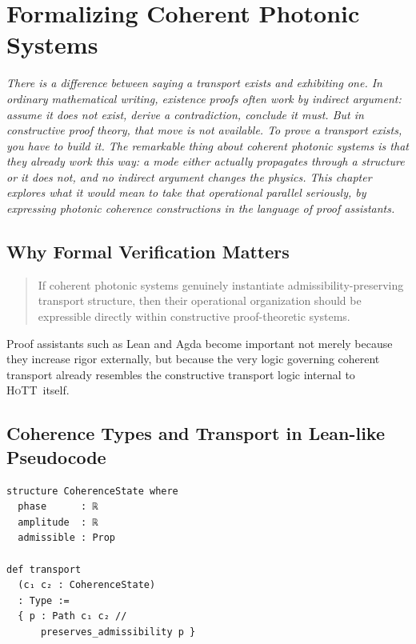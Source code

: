 \documentclass[11pt,openany]{book}
\theoremstyle{definition}
\theoremstyle{plain}
\newcommand{\HoTT}{\textsc{HoTT}}
\begin{document}

\chapter{Formalizing Coherent Photonic Systems}

\noindent\textit{There is a difference between saying a transport exists and exhibiting one. In ordinary mathematical writing, existence proofs often work by indirect argument: assume it does not exist, derive a contradiction, conclude it must. But in constructive proof theory, that move is not available. To prove a transport exists, you have to build it. The remarkable thing about coherent photonic systems is that they already work this way: a mode either actually propagates through a structure or it does not, and no indirect argument changes the physics. This chapter explores what it would mean to take that operational parallel seriously, by expressing photonic coherence constructions in the language of proof assistants.}

\bigskip

\section{Why Formal Verification Matters}

\begin{quote}
If coherent photonic systems genuinely instantiate admissibility-preserving transport structure, then their operational organization should be expressible directly within constructive proof-theoretic systems.
\end{quote}

Proof assistants such as Lean and Agda become important not merely because they increase rigor externally, but because the very logic governing coherent transport already resembles the constructive transport logic internal to \HoTT\ itself.

\section{Coherence Types and Transport in Lean-like Pseudocode}

\begin{verbatim}
structure CoherenceState where
  phase      : ℝ
  amplitude  : ℝ
  admissible : Prop

def transport
  (c₁ c₂ : CoherenceState)
  : Type :=
  { p : Path c₁ c₂ //
      preserves_admissibility p }
\end{verbatim}
\end{document}

